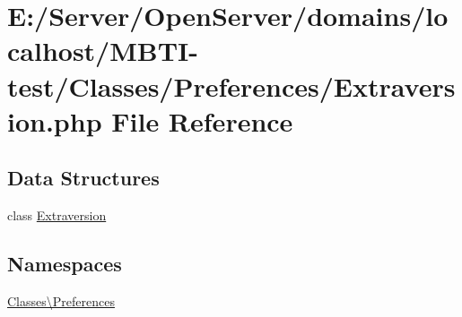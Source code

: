 \hypertarget{_extraversion_8php}{}\section{E\+:/\+Server/\+Open\+Server/domains/localhost/\+M\+B\+T\+I-\/test/\+Classes/\+Preferences/\+Extraversion.php File Reference}
\label{_extraversion_8php}
\subsection*{Data Structures}
\begin{DoxyCompactItemize}
\item 
class \hyperlink{class_classes_1_1_preferences_1_1_extraversion}{Extraversion}
\end{DoxyCompactItemize}
\subsection*{Namespaces}
\begin{DoxyCompactItemize}
\item 
 \hyperlink{namespace_classes_1_1_preferences}{Classes\textbackslash{}\+Preferences}
\end{DoxyCompactItemize}
